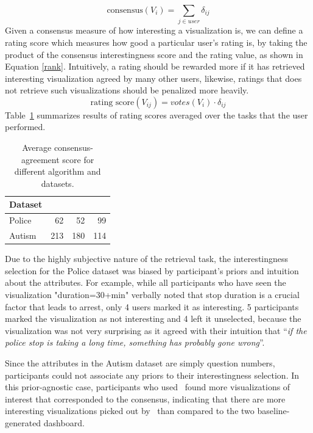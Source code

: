 \begin{equation}\label{vote} 
\textrm{consensus}(V_i) =\sum_{j\in user} \delta_{ij}
\end{equation}
Given a consensus measure of how interesting a visualization is, we can define a rating score which measures how good a particular user's rating is, by taking the product of the consensus interestingness score and the rating value, as shown in Equation \ref{rank}. Intuitively, a rating should be rewarded more if it has retrieved interesting visualization agreed by many other users, likewise, ratings that does not retrieve such visualizations should be penalized more heavily.
\begin{equation}\label{rank}
\textrm{rating score}(V_{ij}) =votes(V_i) \cdot \delta_{ij}
\end{equation}
Table~\ref{table:interesting_score} summarizes results of rating scores averaged over the tasks that the user performed.
\begin{table}[ht!]
	\centering
	\begin{tabular}{lrrr}
		\hline
		 Dataset   &   \system &   \cluster &   \BFS \\
		\hline
		 Police    &        62 &        52 &    99 \\
		 Autism    &       213 &       180 &   114 \\
		\hline
	\end{tabular}
	\caption{Average consensus-agreement score for different algorithm and datasets.}%
	\label{table:interesting_score}
	\vspace{-10pt}
\end{table}
\npar Due to the highly subjective nature of the retrieval task, the interestingness selection for the Police dataset was biased by participant's priors and intuition about the attributes. For example, while all participants who have seen the visualization "duration=30+min" verbally noted that stop duration is a crucial factor that leads to arrest, only 4 users marked it as interesting. 5 participants marked the visualization as not interesting and 4 left it unselected, because the visualization was not very surprising as it agreed with their intuition that ``\textit{if the police stop is taking a long time, something has probably gone wrong}''.
\par Since the attributes in the Autism dataset are simply question numbers, participants could not associate any priors to their interestingness selection. In this prior-agnostic case, participants who used \system\ found more visualizations of interest that corresponded to the consensus, indicating that there are more interesting visualizations picked out by \system\ than compared to the two baseline-generated dashboard.  

